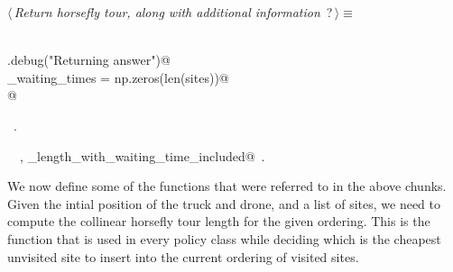 \documentclass[11.5pt]{report}
\begin{document}
\begin{flushleft} \small\label{scrap30}\raggedright\small
{} $\langle\,${\itshape Return horsefly tour, along with additional information}\nobreak\ {\footnotesize {?}}$\,\rangle\equiv$
\vspace{-1ex}
\begin{list}{}{} \item
\mbox{}\verb@@\\
\mbox{}\verb@logger.debug("Returning answer")@\\
\mbox{}\verb@horse_waiting_times = np.zeros(len(sites))@\\
\mbox{}@\\
\mbox{}\verb@@{\NWsep}
\end{list}
\vspace{-1.5ex}
\footnotesize
\begin{list}{}{\setlength{\itemsep}{-\parsep}\setlength{\itemindent}{-\leftmargin}}
\item \NWtxtMacroRefIn\ .
\item \NWtxtIdentsUsed\nobreak\  \verb@logger@\nobreak\ , \verb@tour_length_with_waiting_time_included@\nobreak\ .
\item{}
\end{list}
\vspace{4ex}
\end{flushleft}
\newchunk We now define some of the functions that were referred to in the above chunks. 
Given the intial position of the truck and drone, and a list of sites, we need to compute 
the collinear horsefly tour length for the given ordering. This is the function that is 
used in every policy class while deciding which is the cheapest unvisited site to insert 
into the current ordering of visited sites. 
\end{document}
